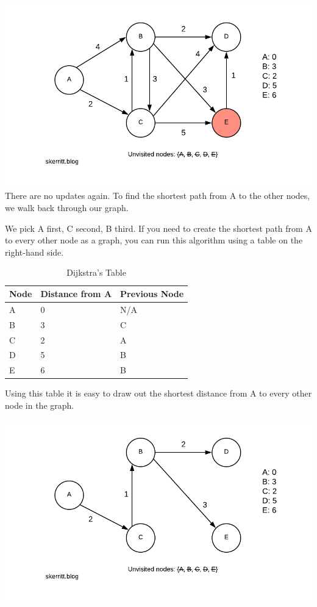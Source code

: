 \documentclass{article}
\begin{document}
\includegraphics[]{Blank-Diagram-43-.png}
There are no updates again. To find the shortest path from A to the other nodes, we walk back through our graph. 

We pick A first, C second, B third. If you need to create the shortest path from A to every other node as a graph, you can run this algorithm using a table on the right-hand side. 
\newpage

\begin{table}[]
\centering
\caption{Dijkstra's Table}
\label{tab:my-table}
\begin{tabular}{|l|l|l|}
\hline
\textbf{Node} & \textbf{Distance from A} & \textbf{Previous Node} \\ \hline
A & 0 & N/A \\ \hline
B & 3 & C \\ \hline
C & 2 & A \\ \hline
D & 5 & B \\ \hline
E & 6 & B \\ \hline
\end{tabular}
\end{table}

Using this table it is easy to draw out the shortest distance from A to every other node in the graph.

\includegraphics{Blank-Diagram-44-.png}
\newpage
\end{document}
